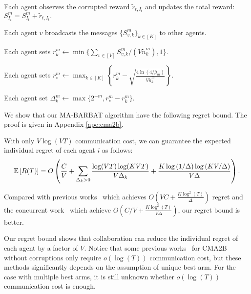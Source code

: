 \begin{algorithm}[t]
{{            Each agent observes the corrupted reward \( \widetilde{r}_{t,I_t} \) and updates the total reward:
            $S_{I_t}^m = S_{I_t}^m + \widetilde{r}_{t,I_t}.$
        }
        
        Each agent $v$ broadcasts the messages $\{S_{v,k}^m\}_{k \in [K]}$ to other agents.
        
        Each agent sets $r_k^m \leftarrow \min \{\sum_{v \in [V]}S_{v,k}^m / (V\widetilde{n}_k^m), 1\}$.
        
        Each agent sets $r_*^m \leftarrow \max_{k \in [K]}\left\{r_k^m - \sqrt{\frac{4\ln(4/\beta_m)}{V\widetilde{n}_k^m}}\right\}$.
        
        Each agent set $\Delta_k^m \leftarrow \max\{2^{-m}, r_*^m - r_k^m\}$.
    }
\end{algorithm}

We show that our MA-BARBAT algorithm have the following regret bound. The proof is given in Appendix \ref{ape:cma2b}.
\begin{theorem}
\label{the:ma-erb}    %
    With only $V\log(VT)$ communication cost, we can guarantee the expected individual regret of each agent $i$ as follows:
    \[{\mathbb{E}}\left[R(T)\right] = O\left(\frac{C}{V} + \sum_{\Delta_k > 0}\frac{\log(VT)\log(KVT)}{V\Delta_k} + \frac{K\log\left(1/\Delta\right)\log\left(KV / \Delta\right)}{V\Delta}\right).\]
\end{theorem}
Compared with previous works~\citep{liu2021cooperative} which achieves $O(VC + \frac{K\log^2(T)}{\Delta})$ regret and the concurrent work~\citep{ghaffari2024multi} which achieve $O(C/V + \frac{K\log^2(T)}{V\Delta})$, our regret bound is better.

\begin{remark}
Our regret bound shows that collaboration can reduce the individual regret of each agent by a factor of $V$. Notice that some previous works~\cite{wang2022achieving} for CMA2B without corruptions only require $o(\log(T))$ communication cost, but these methods significantly depends on the assumption of unique best arm. For the case with multiple best arms, it is still unknown whether $o(\log(T))$  communication cost is enough.  
\end{remark}